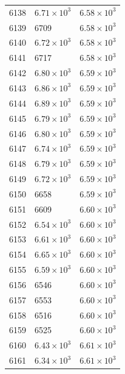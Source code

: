 \begin{table}[H]
\begin{tabular}{lll}
6138 & $\displaystyle 6.71 \times 10^{3}$ & $\displaystyle 6.58 \times 10^{3}$ \\
6139 & 6709 & $\displaystyle 6.58 \times 10^{3}$ \\
6140 & $\displaystyle 6.72 \times 10^{3}$ & $\displaystyle 6.58 \times 10^{3}$ \\
6141 & 6717 & $\displaystyle 6.58 \times 10^{3}$ \\
6142 & $\displaystyle 6.80 \times 10^{3}$ & $\displaystyle 6.59 \times 10^{3}$ \\
6143 & $\displaystyle 6.86 \times 10^{3}$ & $\displaystyle 6.59 \times 10^{3}$ \\
6144 & $\displaystyle 6.89 \times 10^{3}$ & $\displaystyle 6.59 \times 10^{3}$ \\
6145 & $\displaystyle 6.79 \times 10^{3}$ & $\displaystyle 6.59 \times 10^{3}$ \\
6146 & $\displaystyle 6.80 \times 10^{3}$ & $\displaystyle 6.59 \times 10^{3}$ \\
6147 & $\displaystyle 6.74 \times 10^{3}$ & $\displaystyle 6.59 \times 10^{3}$ \\
6148 & $\displaystyle 6.79 \times 10^{3}$ & $\displaystyle 6.59 \times 10^{3}$ \\
6149 & $\displaystyle 6.72 \times 10^{3}$ & $\displaystyle 6.59 \times 10^{3}$ \\
6150 & 6658 & $\displaystyle 6.59 \times 10^{3}$ \\
6151 & 6609 & $\displaystyle 6.60 \times 10^{3}$ \\
6152 & $\displaystyle 6.54 \times 10^{3}$ & $\displaystyle 6.60 \times 10^{3}$ \\
6153 & $\displaystyle 6.61 \times 10^{3}$ & $\displaystyle 6.60 \times 10^{3}$ \\
6154 & $\displaystyle 6.65 \times 10^{3}$ & $\displaystyle 6.60 \times 10^{3}$ \\
6155 & $\displaystyle 6.59 \times 10^{3}$ & $\displaystyle 6.60 \times 10^{3}$ \\
6156 & 6546 & $\displaystyle 6.60 \times 10^{3}$ \\
6157 & 6553 & $\displaystyle 6.60 \times 10^{3}$ \\
6158 & 6516 & $\displaystyle 6.60 \times 10^{3}$ \\
6159 & 6525 & $\displaystyle 6.60 \times 10^{3}$ \\
6160 & $\displaystyle 6.43 \times 10^{3}$ & $\displaystyle 6.61 \times 10^{3}$ \\
6161 & $\displaystyle 6.34 \times 10^{3}$ & $\displaystyle 6.61 \times 10^{3}$ \\

\end{tabular}
\end{table}
